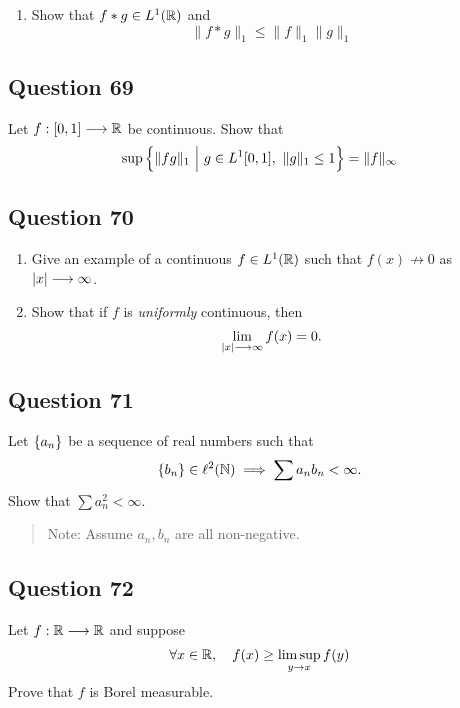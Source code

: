 \documentclass[12pt]{article}
\providecommand{\tightlist}{%
  \setlength{\itemsep}{0pt}\setlength{\parskip}{0pt}}
\begin{document}
\begin{enumerate}
\def\labelenumi{\arabic{enumi}.}
\setcounter{enumi}{1}
\tightlist
\item
  Show that \(f\ast g \in L^1({\mathbb{R}})\) and \[
  \|f * g\|_{1} \leq\|f\|_{1}\|g\|_{1}
  \]
\end{enumerate}

\hypertarget{question-69-1}{%
\subsection{Question 69}\label{question-69-1}}

Let \(f: [0, 1] \longrightarrow {\mathbb{R}}\) be continuous. Show that \[
\sup \left\{\|f g\|_{1} {~\mathrel{\Big|}~} g \in L^{1}[0,1],~~ \|g\|_{1} \leq 1\right\}=\|f\|_{\infty}
\]

\hypertarget{question-70-1}{%
\subsection{Question 70}\label{question-70-1}}

\begin{enumerate}
\def\labelenumi{\arabic{enumi}.}
\item
  Give an example of a continuous \(f\in L^1({\mathbb{R}})\) such that
  \(f(x) \not\to 0\) as\({\left\lvert {x} \right\rvert} \longrightarrow \infty\).
\item
  Show that if \(f\) is \emph{uniformly} continuous, then \[
  \lim_{{\left\lvert {x} \right\rvert} \longrightarrow \infty} f(x) = 0.
  \]
\end{enumerate}

\hypertarget{question-71-1}{%
\subsection{Question 71}\label{question-71-1}}

Let \(\left\{{a_n}\right\}\) be a sequence of real numbers such that \[
\left\{{b_n}\right\} \in \ell^2({\mathbb{N}}) \implies \sum a_n b_n < \infty.
\] Show that \(\sum a_n^2 < \infty\).

\begin{quote}
Note: Assume \(a_n, b_n\) are all non-negative.
\end{quote}

\hypertarget{question-72-1}{%
\subsection{Question 72}\label{question-72-1}}

Let \(f: {\mathbb{R}} \longrightarrow {\mathbb{R}}\) and suppose \[
\forall x\in {\mathbb{R}},\quad f(x) \geq \limsup _{y \rightarrow x} f(y)
\] Prove that \(f\) is Borel measurable.
\end{document}

